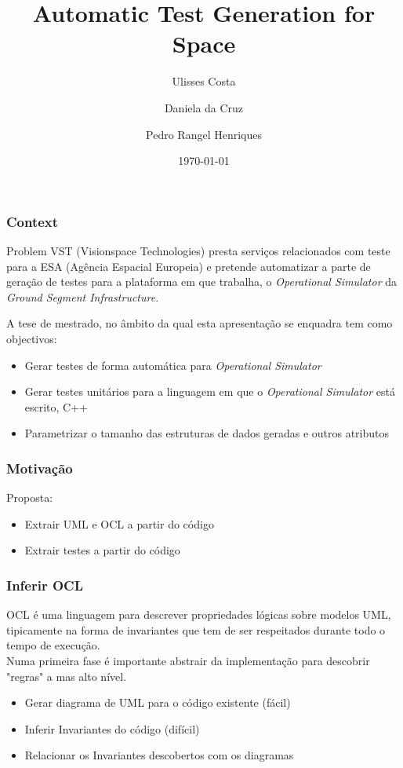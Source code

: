 \documentclass{beamer}
\title{Automatic Test Generation for Space}
\author{Ulisses Costa \and Daniela da Cruz \and Pedro Rangel Henriques}
\date{\today}
\begin{document}
\begin{frame}
   \titlepage
\end{frame}

\begin{frame}\frametitle{Context}
\begin{block}{Problem}
VST (Visionspace Technologies) presta serviços relacionados com teste para a ESA (Agência Espacial Europeia) e pretende automatizar
a parte de geração de testes para a plataforma em que trabalha, o \textit{Operational Simulator} da \textit{Ground Segment Infrastructure}.
\end{block}{}

A tese de mestrado, no âmbito da qual esta apresentação se enquadra tem como objectivos:
\begin{itemize}
\item Gerar testes de forma automática para \textit{Operational Simulator}
\item Gerar testes unitários para a linguagem em que o \textit{Operational Simulator} está escrito, C++
\item Parametrizar o tamanho das estruturas de dados geradas e outros atributos
\end{itemize}
\end{frame}

\begin{frame}\frametitle{Motivação}
Proposta:
\begin{itemize}
\item Extrair UML e OCL a partir do código
\item Extrair testes a partir do código
\end{itemize}
\end{frame}

\begin{frame}\frametitle{Inferir OCL}
OCL é uma linguagem para descrever propriedades lógicas sobre modelos UML, tipicamente na forma de invariantes que tem de ser respeitados durante todo o tempo de execução.\\

Numa primeira fase é importante abstrair da implementação para descobrir "regras" a mas alto nível.
\begin{itemize}
\item Gerar diagrama de UML para o código existente (fácil)
\item Inferir Invariantes do código (difícil)
\item Relacionar os Invariantes descobertos com os diagramas
\end{itemize}
\end{frame}
\end{document}
